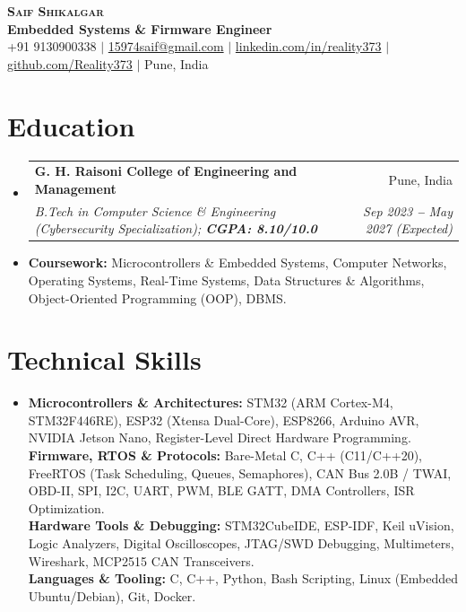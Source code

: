 \documentclass[letterpaper,9pt]{extarticle}
\makeatletter
\newcommand{\resumeSubheading}[4]{
  \vspace{-2pt}\item
    \begin{tabular*}{\linewidth}[t]{l@{\extracolsep{\fill}}r}
      \textbf{#1} & #2 \\
      \textit{\small#3} & \textit{\small #4} \\
    \end{tabular*}\vspace{-5pt}
}
\newcommand{\resumeSubHeadingListStart}{\begin{itemize}[leftmargin=0.08in, label={}]}
\newcommand{\resumeSubHeadingListEnd}{\end{itemize}\vspace{-5pt}}
\makeatother
\begin{document}
\begin{center}
    \textbf{\LARGE \scshape Saif Shikalgar} \\ \vspace{2pt}
    \small
    \textbf{Embedded Systems \& Firmware Engineer} \\ \vspace{1.5pt}
    +91 9130900338
    $|$
    \href{mailto:15974saif@gmail.com}{15974saif@gmail.com}
    $|$
    \href{https://www.linkedin.com/in/reality373}{linkedin.com/in/reality373}
    $|$
    \href{https://github.com/Reality373}{github.com/Reality373}
    $|$
    Pune, India
\end{center}
\vspace{-6pt}

\section{Education}
  \vspace{1pt}
  \resumeSubHeadingListStart
    \resumeSubheading
      {G. H. Raisoni College of Engineering and Management}{Pune, India}
      {B.Tech in Computer Science \& Engineering (Cybersecurity Specialization); \textbf{CGPA: 8.10/10.0}}{Sep 2023 \textbf{--} May 2027 (Expected)}
      \vspace{-2pt}
      \item{
        \small{\textbf{Coursework:} Microcontrollers \& Embedded Systems, Computer Networks, Operating Systems, Real-Time Systems, Data Structures \& Algorithms, Object-Oriented Programming (OOP), DBMS.}
      }
  \resumeSubHeadingListEnd

\section{Technical Skills}
  \vspace{1pt}
  \resumeSubHeadingListStart
    \item{
        \small{\textbf{Microcontrollers \& Architectures:}{ STM32 (ARM Cortex-M4, STM32F446RE), ESP32 (Xtensa Dual-Core), ESP8266, Arduino AVR, NVIDIA Jetson Nano, Register-Level Direct Hardware Programming.}} \\ \vspace{1.5pt}
        \small{\textbf{Firmware, RTOS \& Protocols:}{ Bare-Metal C, C++ (C11/C++20), FreeRTOS (Task Scheduling, Queues, Semaphores), CAN Bus 2.0B / TWAI, OBD-II, SPI, I2C, UART, PWM, BLE GATT, DMA Controllers, ISR Optimization.}} \\ \vspace{1.5pt}
        \small{\textbf{Hardware Tools \& Debugging:}{ STM32CubeIDE, ESP-IDF, Keil uVision, Logic Analyzers, Digital Oscilloscopes, JTAG/SWD Debugging, Multimeters, Wireshark, MCP2515 CAN Transceivers.}} \\ \vspace{1.5pt}
        \small{\textbf{Languages \& Tooling:}{ C, C++, Python, Bash Scripting, Linux (Embedded Ubuntu/Debian), Git, Docker.}}
    }
  \resumeSubHeadingListEnd
\end{document}
